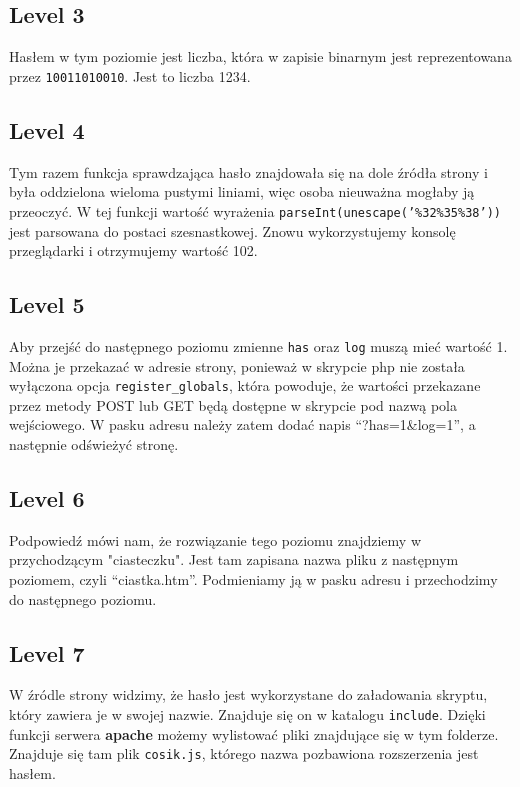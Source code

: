 \documentclass[11pt]{article}
\begin{document}
\subsection{Level 3}

Hasłem w tym poziomie jest liczba, która w zapisie binarnym jest reprezentowana przez \texttt{10011010010}. Jest to liczba 1234.

\subsection{Level 4}

Tym razem funkcja sprawdzająca hasło znajdowała się na dole źródła strony i była oddzielona wieloma pustymi liniami, więc osoba nieuważna mogłaby ją przeoczyć. W tej funkcji wartość wyrażenia \texttt{parseInt(unescape('\%32\%35\%38'))} jest parsowana do postaci szesnastkowej. Znowu wykorzystujemy konsolę przeglądarki i otrzymujemy wartość 102.  

\subsection{Level 5}

Aby przejść do następnego poziomu zmienne \texttt{has} oraz \texttt{log} muszą mieć wartość 1. Można je przekazać w adresie strony, ponieważ w skrypcie php nie została wyłączona opcja \newline \texttt{register\_globals}, która powoduje, że wartości przekazane przez metody POST lub GET będą dostępne w skrypcie pod nazwą pola wejściowego. W pasku adresu należy zatem dodać napis ``?has=1\&log=1'', a następnie odświeżyć stronę.

\subsection{Level 6}

Podpowiedź mówi nam, że rozwiązanie tego poziomu znajdziemy w przychodzącym "ciasteczku". Jest tam zapisana nazwa pliku z następnym poziomem, czyli ``ciastka.htm''. Podmieniamy ją w pasku adresu i przechodzimy do następnego poziomu.

\subsection{Level 7}

W źródle strony widzimy, że hasło jest wykorzystane do załadowania skryptu, który zawiera je w swojej nazwie. Znajduje się on w katalogu \texttt{include}. Dzięki funkcji serwera \textbf{apache} możemy wylistować pliki znajdujące się w tym folderze. Znajduje się tam plik \texttt{cosik.js}, którego nazwa pozbawiona rozszerzenia jest hasłem.
\end{document}

